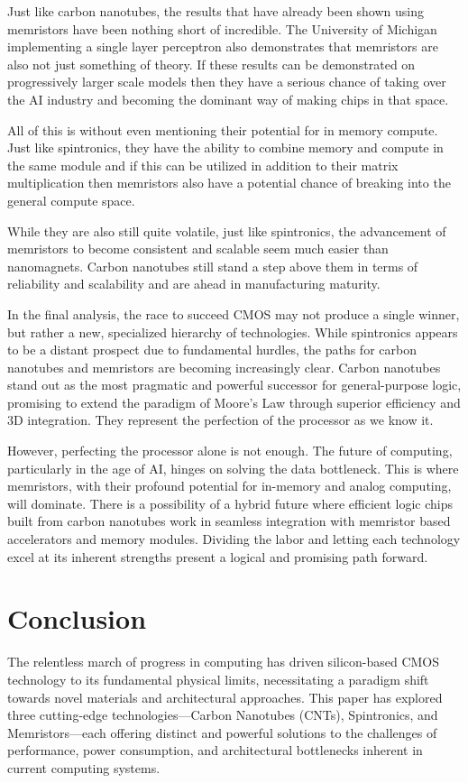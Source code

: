 \documentclass[sigconf]{acmart}
\begin{document}
Just like carbon nanotubes, the results that have already been shown using memristors have 
been nothing short of incredible. The University of Michigan implementing a single layer 
perceptron also demonstrates that memristors are also not just something of theory. If these 
results can be demonstrated on progressively larger scale models then they have a serious 
chance of taking over the AI industry and becoming the dominant way of making chips in
that space. 

All of this is without even mentioning their potential for in memory compute. Just like 
spintronics, they have the ability to combine memory and compute in the same module and 
if this can be utilized in addition to their matrix multiplication then memristors also 
have a potential chance of breaking into the general compute space. 

While they are also still quite volatile, just like spintronics, the advancement of 
memristors to become consistent and scalable seem much easier than nanomagnets. Carbon 
nanotubes still stand a step above them in terms of reliability and scalability and are 
ahead in manufacturing maturity. 

In the final analysis, the race to succeed CMOS may not produce a single winner, 
but rather a new, specialized hierarchy of technologies. While spintronics appears to 
be a distant prospect due to fundamental hurdles, the paths for carbon nanotubes and 
memristors are becoming increasingly clear. Carbon nanotubes stand out as the most 
pragmatic and powerful successor for general-purpose logic, promising to extend the 
paradigm of Moore's Law through superior efficiency and 3D integration. They represent 
the perfection of the processor as we know it.

However, perfecting the processor alone is not enough. The future of computing, 
particularly in the age of AI, hinges on solving the data bottleneck. This is where 
memristors, with their profound potential for in-memory and analog computing, will 
dominate. There is a possibility of a hybrid future where efficient logic chips built 
from carbon nanotubes work in seamless integration with memristor based accelerators 
and memory modules. Dividing the labor and letting each technology excel at its 
inherent strengths present a logical and promising path forward. 


\section{Conclusion}
The relentless march of progress in computing has driven 
silicon-based CMOS technology to its fundamental physical limits, 
necessitating a paradigm shift towards novel materials and 
architectural approaches. This paper has explored three 
cutting-edge technologies—Carbon Nanotubes (CNTs), Spintronics, 
and Memristors—each offering distinct and powerful solutions to 
the challenges of performance, power consumption, and 
architectural bottlenecks inherent in current computing systems.
\end{document}
